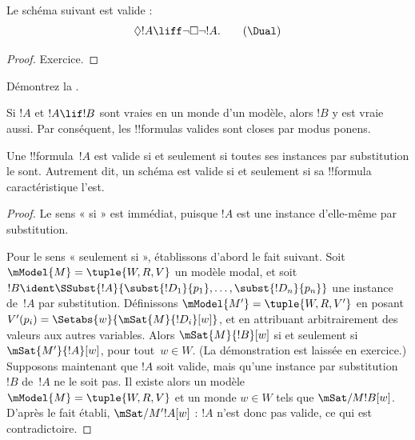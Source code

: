 \documentclass[../../../include/open-logic-section]{subfiles}
\begin{document}
\begin{prop}
  Le schéma \Dual{} suivant est valide :
  \begin{equation*}
  \Diamond !A \liff \lnot\Box\lnot !A. \tag{\Dual}
  \end{equation*}
\end{prop}

\begin{proof}
  Exercice.
\end{proof}

\begin{prob}
  Démontrez la .
\end{prob}

\begin{prop}
  Si $!A$ et $!A \lif !B$ sont vraies en un monde d'un modèle,
  alors $!B$ y est vraie aussi. Par conséquent, les !!{formula}s
  valides sont closes par modus ponens.
\end{prop}

\begin{prop}
  Une !!{formula}~$!A$ est valide si et seulement si toutes ses
  instances par substitution le sont. Autrement dit, un schéma
  est valide si et seulement si sa !!{formula} caractéristique
  l'est.
\end{prop}

\begin{proof}
  Le sens « si » est immédiat, puisque $!A$ est une instance
  d'elle-même par substitution.

  Pour le sens « seulement si », établissons d'abord le fait
  suivant. Soit $\mModel{M} = \tuple{W, R, V}$ un modèle modal,
  et soit $!B \ident
  \SSubst{!A}{\subst{!D_1}{p_1},\dots,\subst{!D_n}{p_n}}$ une
  instance de~$!A$ par substitution. Définissons
  $\mModel{M'} = \tuple{W, R, V'}$ en posant
  $V'(p_i) = \Setabs{w}{\mSat{M}{!D_i}[w]}$, et en attribuant
  arbitrairement des valeurs aux autres variables. Alors
  $\mSat{M}{!B}[w]$ si et seulement si
  $\mSat{M'}{!A}[w]$, pour tout~$w \in W$. (La démonstration
  est laissée en exercice.) Supposons maintenant que $!A$ soit
  valide, mais qu'une instance par substitution~$!B$ de~$!A$
  ne le soit pas.
  Il existe alors un modèle
  $\mModel{M} = \tuple{W, R, V}$ et un monde $w \in W$ tels que
  $\mSat/{M}{!B}[w]$. D'après le fait établi,
  $\mSat/{M'}{!A}[w]$ : $!A$ n'est donc pas valide,
  ce qui est contradictoire.
\end{proof}
\end{document}
